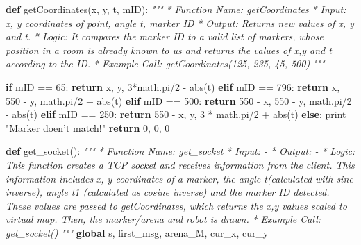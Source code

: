 \documentclass[]{article}
\newenvironment{Shaded}{}{}
\newcommand{\KeywordTok}[1]{\textcolor[rgb]{0.00,0.44,0.13}{\textbf{{#1}}}}
\newcommand{\DecValTok}[1]{\textcolor[rgb]{0.25,0.63,0.44}{{#1}}}
\newcommand{\StringTok}[1]{\textcolor[rgb]{0.25,0.44,0.63}{{#1}}}
\newcommand{\CommentTok}[1]{\textcolor[rgb]{0.38,0.63,0.69}{\textit{{#1}}}}
\newcommand{\ControlFlowTok}[1]{\textcolor[rgb]{0.00,0.44,0.13}{\textbf{{#1}}}}
\newcommand{\OperatorTok}[1]{\textcolor[rgb]{0.40,0.40,0.40}{{#1}}}
\newcommand{\BuiltInTok}[1]{{#1}}
\newcommand{\NormalTok}[1]{{#1}}
\begin{document}
\begin{Shaded}
\begin{Highlighting}[]
\KeywordTok{def} \NormalTok{getCoordinates(x, y, t, mID):}
    \CommentTok{"""}
\CommentTok{    * Function Name:    getCoordinates}
\CommentTok{    * Input:        x, y coordinates of point, angle t, marker ID}
\CommentTok{    * Output:       Returns new values of x, y and t.}
\CommentTok{    * Logic:        It compares the marker ID to a valid list of markers,}
\CommentTok{                        whose position in a room is already known to us and}
\CommentTok{                        returns the values of x,y and t according to the ID.}
\CommentTok{    * Example Call: getCoordinates(125, 235, 45, 500)}
\CommentTok{    """}

    \ControlFlowTok{if} \NormalTok{mID }\OperatorTok{==} \DecValTok{65}\NormalTok{:}
        \ControlFlowTok{return} \NormalTok{x, y, }\DecValTok{3}\OperatorTok{*}\NormalTok{math.pi}\OperatorTok{/}\DecValTok{2} \OperatorTok{-} \BuiltInTok{abs}\NormalTok{(t)}
    \ControlFlowTok{elif} \NormalTok{mID }\OperatorTok{==} \DecValTok{796}\NormalTok{:}
        \ControlFlowTok{return} \NormalTok{x, }\DecValTok{550} \OperatorTok{-} \NormalTok{y, math.pi}\OperatorTok{/}\DecValTok{2} \OperatorTok{+} \BuiltInTok{abs}\NormalTok{(t)}
    \ControlFlowTok{elif} \NormalTok{mID }\OperatorTok{==} \DecValTok{500}\NormalTok{:}
        \ControlFlowTok{return} \DecValTok{550} \OperatorTok{-} \NormalTok{x, }\DecValTok{550} \OperatorTok{-} \NormalTok{y, math.pi}\OperatorTok{/}\DecValTok{2} \OperatorTok{-} \BuiltInTok{abs}\NormalTok{(t)}
    \ControlFlowTok{elif} \NormalTok{mID }\OperatorTok{==} \DecValTok{250}\NormalTok{:}
        \ControlFlowTok{return} \DecValTok{550} \OperatorTok{-} \NormalTok{x, y, }\DecValTok{3} \OperatorTok{*} \NormalTok{math.pi}\OperatorTok{/}\DecValTok{2} \OperatorTok{+} \BuiltInTok{abs}\NormalTok{(t)}
    \ControlFlowTok{else}\NormalTok{:}
        \BuiltInTok{print} \StringTok{"Marker doen't match!"}
        \ControlFlowTok{return} \DecValTok{0}\NormalTok{, }\DecValTok{0}\NormalTok{, }\DecValTok{0}



\KeywordTok{def} \NormalTok{get_socket():}
    \CommentTok{"""}
\CommentTok{    * Function Name:    get_socket}
\CommentTok{    * Input:        -}
\CommentTok{    * Output:       -}
\CommentTok{    * Logic:        This function creates a TCP socket and receives}
\CommentTok{                        information from the client. This information includes}
\CommentTok{                        x, y coordinates of a marker, the angle t(calculated}
\CommentTok{                        with sine inverse), angle t1 (calculated as cosine}
\CommentTok{                        inverse) and the marker ID detected. These values are}
\CommentTok{                        passed to getCoordinates, which returns the x,y}
\CommentTok{                        values scaled to virtual map. Then, the marker/arena and}
\CommentTok{                        robot is drawn.}
\CommentTok{    * Example Call: get_socket()}
\CommentTok{    """}
    \KeywordTok{global} \NormalTok{s, first_msg, arena_M, cur_x, cur_y}


\end{Highlighting}
\end{Shaded}
\end{document}
